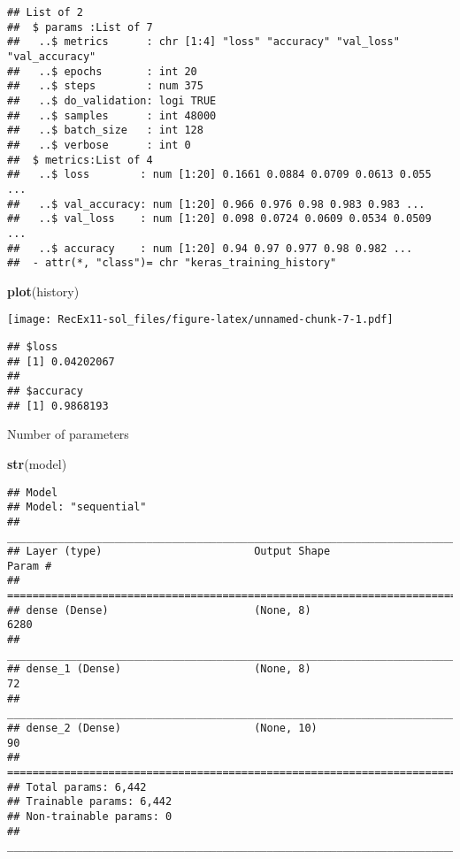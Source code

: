 \documentclass[]{article}
\newenvironment{Shaded}{\begin{snugshade}}{\end{snugshade}}
\newcommand{\KeywordTok}[1]{\textcolor[rgb]{0.13,0.29,0.53}{\textbf{#1}}}
\newcommand{\NormalTok}[1]{#1}
\newcommand{\OperatorTok}[1]{\textcolor[rgb]{0.81,0.36,0.00}{\textbf{#1}}}
\newcommand{\StringTok}[1]{\textcolor[rgb]{0.31,0.60,0.02}{#1}}
\begin{document}
\begin{verbatim}
## List of 2
##  $ params :List of 7
##   ..$ metrics      : chr [1:4] "loss" "accuracy" "val_loss" "val_accuracy"
##   ..$ epochs       : int 20
##   ..$ steps        : num 375
##   ..$ do_validation: logi TRUE
##   ..$ samples      : int 48000
##   ..$ batch_size   : int 128
##   ..$ verbose      : int 0
##  $ metrics:List of 4
##   ..$ loss        : num [1:20] 0.1661 0.0884 0.0709 0.0613 0.055 ...
##   ..$ val_accuracy: num [1:20] 0.966 0.976 0.98 0.983 0.983 ...
##   ..$ val_loss    : num [1:20] 0.098 0.0724 0.0609 0.0534 0.0509 ...
##   ..$ accuracy    : num [1:20] 0.94 0.97 0.977 0.98 0.982 ...
##  - attr(*, "class")= chr "keras_training_history"
\end{verbatim}

\begin{Shaded}
\begin{Highlighting}[]
\KeywordTok{plot}\NormalTok{(history)}
\end{Highlighting}
\end{Shaded}

\texttt{[image: RecEx11-sol\_files/figure-latex/unnamed-chunk-7-1.pdf]}

\begin{Shaded}
\end{Shaded}

\begin{verbatim}
## $loss
## [1] 0.04202067
## 
## $accuracy
## [1] 0.9868193
\end{verbatim}

Number of parameters

\begin{Shaded}
\begin{Highlighting}[]
\KeywordTok{str}\NormalTok{(model)}
\end{Highlighting}
\end{Shaded}

\begin{verbatim}
## Model
## Model: "sequential"
## ________________________________________________________________________________
## Layer (type)                        Output Shape                    Param #     
## ================================================================================
## dense (Dense)                       (None, 8)                       6280        
## ________________________________________________________________________________
## dense_1 (Dense)                     (None, 8)                       72          
## ________________________________________________________________________________
## dense_2 (Dense)                     (None, 10)                      90          
## ================================================================================
## Total params: 6,442
## Trainable params: 6,442
## Non-trainable params: 0
## ________________________________________________________________________________
\end{verbatim}
\end{document}
